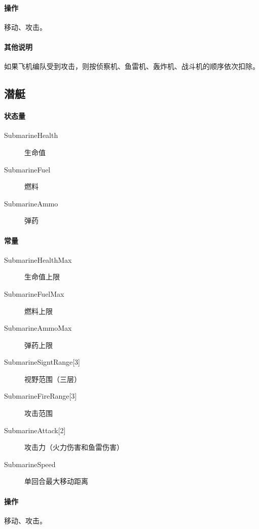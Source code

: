 \documentclass[11pt,a4paper]{article}
\begin{document}
      \paragraph{操作} 移动、攻击。
      \paragraph{其他说明}
        如果飞机编队受到攻击，则按侦察机、鱼雷机、轰炸机、战斗机的顺序依次扣除。


    \subsection{潜艇}
      \paragraph{状态量}
        \begin{minipage}[t]{0.6\textwidth}
          \begin{description}
            \item[SubmarineHealth] 生命值
            \item[SubmarineFuel] 燃料
            \item[SubmarineAmmo] 弹药
          \end{description}
        \end{minipage}

      \paragraph{常量}
        \begin{minipage}[t]{0.6\textwidth}
          \begin{description}
            \item[SubmarineHealthMax] 生命值上限
            \item[SubmarineFuelMax] 燃料上限
            \item[SubmarineAmmoMax] 弹药上限
            \item[{SubmarineSigntRange[3]}] 视野范围（三层）
            \item[{SubmarineFireRange[3]}] 攻击范围
            \item[{SubmarineAttack[2]}] 攻击力（火力伤害和鱼雷伤害）
            \item[SubmarineSpeed] 单回合最大移动距离
          \end{description}
        \end{minipage}

      \paragraph{操作} 移动、攻击。
\end{document}
